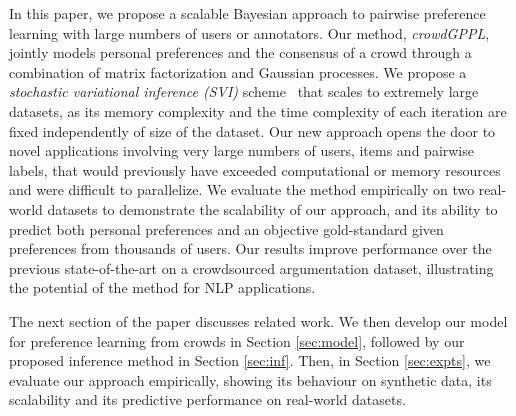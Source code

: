In this paper, we propose a scalable Bayesian approach to pairwise preference learning with 
large numbers of users or annotators. %
Our method, \emph{crowdGPPL},
 jointly models personal preferences and the consensus of a crowd through a combination of
matrix factorization and Gaussian processes. 
We propose a \emph{stochastic variational inference (SVI)} scheme~\citep{hoffman2013stochastic}
that scales to extremely large datasets, as its
memory complexity and the time complexity of each iteration are 
fixed independently of size of the dataset.
Our new approach opens the door to novel applications involving very large numbers of users, items and pairwise labels,
that would previously have exceeded computational or memory resources and were difficult to parallelize.
We evaluate the method empirically on two real-world datasets to demonstrate 
the scalability of our approach,
and its ability to predict both personal preferences and an objective gold-standard given 
preferences from thousands of users.
Our results improve performance over the previous state-of-the-art \citep{simpson2018finding} on a crowdsourced argumentation dataset, illustrating the potential of the method for NLP applications.

The next section of the paper discusses related work.
We then develop our model for preference learning from crowds in Section \ref{sec:model},
followed by our proposed inference method in Section \ref{sec:inf}.
Then, in Section \ref{sec:expts}, 
we evaluate our approach empirically, showing its behaviour on synthetic data, 
its scalability and its predictive performance on real-world datasets.
